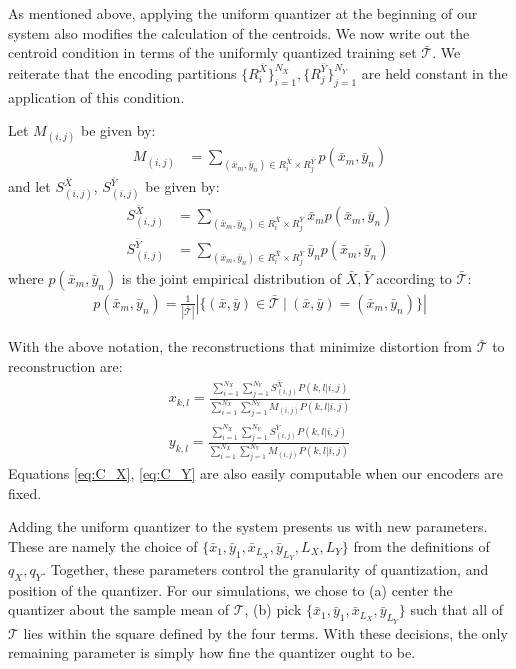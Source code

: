 As mentioned above, applying the uniform quantizer at the beginning of our system also modifies the calculation of the centroids. We now write out the centroid condition in terms of the uniformly quantized training set $\mathcal{\bar T}$. We reiterate that the encoding partitions $\{R_i^{\bar X}\}_{i=1}^{N_X}, \{R_j^{\bar Y}\}_{j=1}^{N_Y}$ are held constant in the application of this condition.

Let $M_{(i,j)}$ be given by:
\begin{align}
    M_{(i,j)} &=
    \sum_{(\bar x_m,\bar y_n)\in R_i^{\bar X}\times R_j^{\bar Y}}p(\bar x_m,\bar y_n)
\end{align}
and let $S_{(i,j)}^{\bar X}$, $S_{(i,j)}^{\bar Y}$ be given by:
\begin{align}
    S^{\bar X}_{(i,j)} &=
    \sum_{(\bar x_m,\bar y_n)\in R_i^{\bar X}\times R_j^{\bar Y}}\bar x_m p(\bar x_m,\bar y_n)\\
    S^{\bar Y}_{(i,j)} &=
    \sum_{(\bar x_m,\bar y_n)\in R_i^{\bar X}\times R_j^{\bar Y}}\bar y_n p(\bar x_m,\bar y_n)
\end{align}
where $p(\bar x_m,\bar y_n)$ is the joint empirical distribution of $\bar X,\bar Y$ according to $\mathcal{\bar T}$:
\begin{align}
    p(\bar x_m,\bar y_n)=\frac{1}{|\mathcal{\bar T}|}\left|\{(\bar x,\bar y)\in\mathcal{\bar T}\ |\ (\bar x,\bar y)=(\bar x_m,\bar y_n)\}\right|
\end{align}

With the above notation, the reconstructions that minimize distortion from $\mathcal{\bar T}$ to reconstruction are:
\begin{align}
    \label{eq:C_X}
    x_{k,l} = 
        \frac{\sum_{i=1}^{N_X} \sum_{j=1}^{N_Y}
        S_{(i,j)}^{\bar X} P(k,l|i,j)}
        {\sum_{i=1}^{N_X} \sum_{j=1}^{N_Y}
        M_{(i,j)} P(k,l|i,j)}\\
    \label{eq:C_Y}
    y_{k,l} = 
        \frac{\sum_{i=1}^{N_X} \sum_{j=1}^{N_Y}
        S_{(i,j)}^{\bar Y} P(k,l|i,j)}
        {\sum_{i=1}^{N_X} \sum_{j=1}^{N_Y}
        M_{(i,j)} P(k,l|i,j)}
\end{align}
Equations \eqref{eq:C_X}, \eqref{eq:C_Y} are also easily computable when our encoders are fixed.

Adding the uniform quantizer to the system presents us with new parameters. These are namely the choice of $\{\bar x_1, \bar y_1, \bar x_{L_X}, \bar y_{L_Y}, L_X, L_Y\}$ from the definitions of $q_X,q_Y$. Together, these parameters control the granularity of quantization, and position of the quantizer. For our simulations, we chose to (a) center the quantizer about the sample mean of $\mathcal T$, (b) pick $\{\bar x_1, \bar y_1, \bar x_{L_X}, \bar y_{L_Y}\}$ such that all of $\mathcal T$ lies within the square defined by the four terms. With these decisions, the only remaining parameter is simply how fine the quantizer ought to be.

